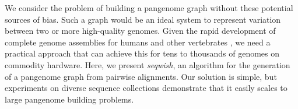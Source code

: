 \documentclass{bioinfo}
\theoremstyle{definition}
\begin{document}
We consider the problem of building a pangenome graph without these potential sources of bias.
Such a graph would be an ideal system to represent variation between two or more high-quality genomes.
Given the rapid development of complete genome assemblies for humans and other vertebrates \citep{Rhie_2021,Nurk_2021}, we need a practical approach that can achieve this for tens to thousands of genomes on commodity hardware.
Here, we present \textit{seqwish}, an algorithm for the generation of a pangenome graph from pairwise alignments.
Our solution is simple, but experiments on diverse sequence collections demonstrate that it easily scales to large pangenome building problems.





\end{document}
